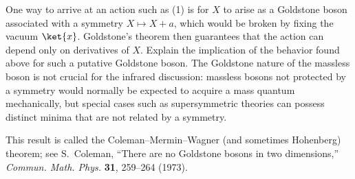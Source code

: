 \begin{enumerate}
\begin{enumerate}
    One way to arrive at an action such as (1) is for \(X\) to arise as a
    Goldstone boson associated with a symmetry \(X\mapsto X+a\), which would
    be broken by fixing the vacuum \(\ket{x}\).  Goldstone's theorem
    then guarantees that the action can depend only on derivatives of
    \(X\).  Explain the implication of the behavior found above for such a
    putative Goldstone boson.  The Goldstone nature of the massless boson is
    not crucial for the infrared discussion: massless bosons not protected
    by a symmetry would normally be expected to acquire a mass quantum
    mechanically, but special cases such as supersymmetric theories can
    possess distinct minima that are not related by a symmetry.

    This result is called the Coleman--Mermin--Wagner (and sometimes
    Hohenberg) theorem; see S.~Coleman, ``There are no Goldstone bosons in
    two dimensions,'' \emph{Commun. Math. Phys.} \textbf{31}, 259--264
    (1973).
  \end{enumerate}

\end{enumerate}
